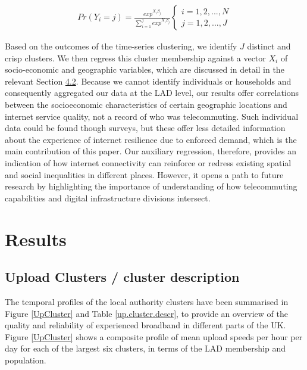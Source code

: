 \documentclass[]{interact}
\theoremstyle{plain}%
\theoremstyle{definition}
\theoremstyle{remark}
\begin{document}
\begin{align}
Pr(Y_{i}=j) = \frac{exp^{X_{i}\beta_{j}}}{\sum_{i=1}^j exp^{X_{i}\beta_{j}}}
\begin{cases}
    i = 1, 2, ... , N \\  
    j = 1, 2, ... , J
\end{cases}\label{eq1}
\end{align}

Based on the outcomes of the time-series clustering, we identify \(J\)
distinct and crisp clusters. We then regress this cluster membership
against a vector \(X_{i}\) of socio-economic and geographic variables,
which are discussed in detail in the relevant Section
\protect\hyperlink{sec:4.2}{4.2}. Because we cannot identify individuals
or households and consequently aggregated our data at the LAD level, our
results offer correlations between the socioeconomic characteristics of
certain geographic locations and internet service quality, not a record
of who was telecommuting. Such individual data could be found though
surveys, but these offer less detailed information about the experience
of internet resilience due to enforced demand, which is the main
contribution of this paper. Our auxiliary regression, therefore,
provides an indication of how internet connectivity can reinforce or
redress existing spatial and social inequalities in different places.
However, it opens a path to future research by highlighting the
importance of understanding of how telecommuting capabilities and
digital infrastructure divisions intersect.

\hypertarget{sec:4}{%
\section{Results}\label{sec:4}}

\hypertarget{sec:4.1}{%
\subsection{Upload Clusters / cluster description}\label{sec:4.1}}

The temporal profiles of the local authority clusters have been
summarised in Figure \ref{UpCluster} and Table \ref{up.cluster.descr},
to provide an overview of the quality and reliability of experienced
broadband in different parts of the UK. Figure \ref{UpCluster} shows a
composite profile of mean upload speeds per hour per day for each of the
largest six clusters, in terms of the LAD membership and population.
\end{document}

